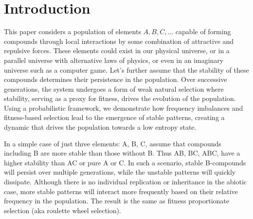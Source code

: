\documentclass[entropy,article,submit,pdftex,moreauthors]{Definitions/mdpi}
\begin{document}


\section{Introduction}

This paper considers a population of elements \( A, B, C, \dots \) capable of forming compounds through local interactions by some combination of attractive and repulsive forces. These elements could exist in our physical universe, or in a parallel universe with alternative laws of physics, or even in an imaginary universe such as a computer game. Let's further assume that the stability of these compounds determines their persistence in the population. Over successive generations, the system undergoes a form of weak natural selection where stability, serving as a proxy for fitness, drives the evolution of the population. Using a probabilistic framework, we demonstrate how frequency imbalances and fitness-based selection lead to the emergence of stable patterns, creating a dynamic that drives the population towards a low entropy state.


In a simple case of just three elements: {A, B, C}, assume that compounds including B are more stable than those without B. Thus AB, BC, ABC, have a higher stability than AC or pure A or C. In such a scenario, stable B-compounds will persist over multiple generations, while the unstable patterns will quickly dissipate. Although there is no individual replication or inheritance in the abiotic case, more stable patterns will interact more frequently based on their relative frequency in the population. The result is the same as fitness proportionate selection (aka roulette wheel selection).

\end{document}
